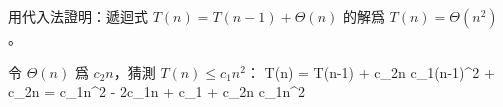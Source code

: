 \startEXERCISE
用代入法證明：遞迴式 $T(n)=T(n-1)+\Theta(n)$ 的解爲 $T(n)=\Theta(n^2)$。
\stopEXERCISE

\startANSWER
令 $\Theta(n)$ 爲 $c_2 n$，猜測 $T(n)\le c_1 n^2$：
\startsplitformula\startmathalignment
\NC T(n) \NC=   T(n-1) + c_2n \NR
\NC      \NC\le c_1(n-1)^2 + c_2n \NR
\NC      \NC=   c_1n^2 - 2c_1n + c_1 + c_2n \NR
\NC      \NC\le c_1n^2 \NR
\stopmathalignment\stopsplitformula
\stopANSWER
